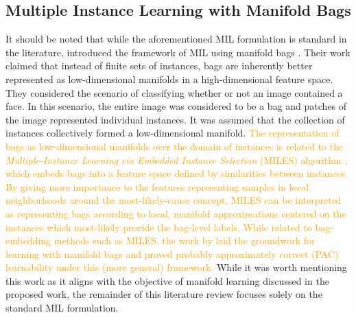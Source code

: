 \subsection{Multiple Instance Learning with Manifold Bags}
It should be noted that while the aforementioned MIL formulation is standard in the literature, \cite{Babenko2011MILManifoldBags} introduced the framework of MIL using manifold bags  .  Their work claimed that instead of finite sets of instances, bags are inherently better represented as low-dimensional manifolds in a high-dimensional feature space.  They considered the scenario of classifying whether or not an image contained a face.  In this scenario, the entire image was considered to be a bag and patches of the image represented individual instances.  It was assumed that the collection of instances collectively formed a low-dimensional manifold.  \textcolor{orange}{The representation of bags as low-dimensional manifolds over the domain of instances is related to the \textit{Multiple-Instance Learning via Embedded Instance Selection} (MILES) algorithm \citep{Chen2006MILES}, which embeds bags into a feature space defined by similarities between instances.  By giving more importance to the features representing samples in local neighborhoods around the most-likely-cause concept, MILES can be interpreted as representing bags according to local, manifold approximations centered on the instances which most-likely provide the bag-level labels.  While related to bag-embedding methods such as MILES, the work by \cite{Babenko2011MILManifoldBags} laid the groundwork for learning with manifold bags and proved probably approximately correct (PAC) learnability under this (more general) framework. } While it was worth mentioning this work as it aligns with the objective of manifold learning discussed in the proposed work, the remainder of this literature review focuses solely on the standard MIL formulation.

